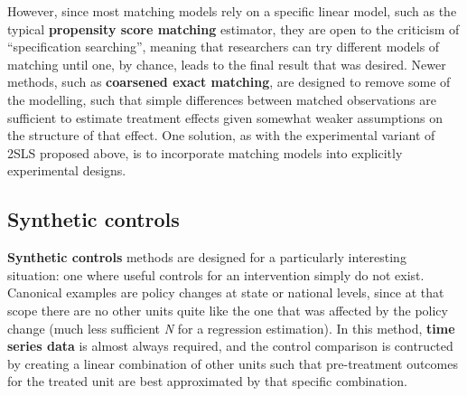 However, since most matching models rely on a specific linear model,
such as the typical \textbf{propensity score matching} estimator,
they are open to the criticism of ``specification searching'',
meaning that researchers can try different models of matching
until one, by chance, leads to the final result that was desired.
Newer methods, such as \textbf{coarsened exact matching}\cite{iacus2012causal},
are designed to remove some of the modelling,
such that simple differences between matched observations
are sufficient to estimate treatment effects
given somewhat weaker assumptions on the structure of that effect.
One solution, as with the experimental variant of 2SLS proposed above,
is to incorporate matching models into explicitly experimental designs.

\subsection{Synthetic controls}

\textbf{Synthetic controls} methods\cite{abadie2015comparative}
are designed for a particularly interesting situation:
one where useful controls for an intervention simply do not exist.
Canonical examples are policy changes at state or national levels,
since at that scope there are no other units quite like
the one that was affected by the policy change
(much less sufficient \textit{N} for a regression estimation).\cite{gobillon2016regional}
In this method, \textbf{time series data} is almost always required,
and the control comparison is contructed by creating
a linear combination of other units such that pre-treatment outcomes
for the treated unit are best approximated by that specific combination.
